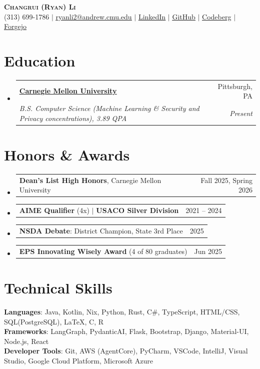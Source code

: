 \documentclass[letterpaper,11pt]{article}
\makeatletter
\newcommand{\resumeSubheading}[4]{
  \vspace{-2pt}\item
    \begin{tabular*}{0.97\textwidth}[t]{l@{\extracolsep{\fill}}r}
      \textbf{#1} & #2 \\
      \textit{\small#3} & \textit{\small #4} \\
    \end{tabular*}\vspace{-7pt}
}
\newcommand{\resumeAwardHeading}[2]{
    \item
    \begin{tabular*}{0.97\textwidth}{l@{\extracolsep{\fill}}r}
      \small#1 & #2 \\
    \end{tabular*}\vspace{-7pt}
}
\newcommand{\resumeSubHeadingListStart}{\begin{itemize}[leftmargin=0.15in, label={}]}
\newcommand{\resumeSubHeadingListEnd}{\end{itemize}}
\makeatother
\begin{document}
\begin{center}
    \textbf{\Huge \scshape Changrui (Ryan) Li} \\ \vspace{1pt}
    \small (313) 699-1786 $|$ \href{mailto:ryanli2@andrew.cmu.edu}{\underline{ryanli2@andrew.cmu.edu}} $|$ \href{https://www.linkedin.com/in/ryan-li-ab139919b/}{\underline{LinkedIn}} $|$
    \href{https://github.com/thesuperRL}{\underline{GitHub}} $|$
    \href{https://codeberg.org/thesuperRL}{\underline{Codeberg}} $|$
    \href{https://git.cmu.dev/thesuperRL}{\underline{Forgejo}}
\end{center}

\section{Education}
  \resumeSubHeadingListStart
      \resumeSubheading
              {\href{https://www.cmu.edu/}{\underline{Carnegie Mellon University}} }{Pittsburgh, PA}
              {B.S. Computer Science (Machine Learning \& Security and Privacy concentrations), 3.89 QPA}{Present}
          
          
  \resumeSubHeadingListEnd

\section{Honors \& Awards}
  \resumeSubHeadingListStart
    \resumeAwardHeading{\textbf{Dean's List High Honors}, Carnegie Mellon University}{Fall 2025, Spring 2026}
    \resumeAwardHeading{\textbf{AIME Qualifier} (4x) $|$ \textbf{USACO Silver Division}}{2021 -- 2024}
    \resumeAwardHeading{\textbf{NSDA Debate}: District Champion, State 3rd Place}{2025}
    \resumeAwardHeading{\textbf{EPS Innovating Wisely Award} (4 of 80 graduates)}{Jun 2025}
  \resumeSubHeadingListEnd

\section{Technical Skills}
 \begin{itemize}[leftmargin=0.15in, label={}]
    \small{\item{
     \textbf{Languages}{: Java, Kotlin, Nix, Python, Rust, C\#, TypeScript, HTML/CSS, SQL(PostgreSQL), \LaTeX, C, R} \\
     \textbf{Frameworks}{: LangGraph, PydanticAI, Flask, Bootstrap, Django, Material-UI, Node.js, React} \\
     \textbf{Developer Tools}{: Git, AWS (AgentCore), PyCharm, VSCode, IntelliJ, Visual Studio, Google Cloud Platform, Microsoft Azure} \\
    }}
 \end{itemize}
\end{document}
